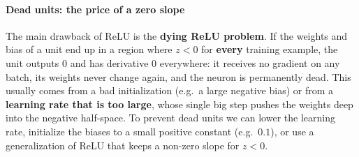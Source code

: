 \paragraph{Dead units: the price of a zero slope}
The main drawback of ReLU is the \textbf{dying ReLU problem}. If the weights and
bias of a unit end up in a region where $z < 0$ for \textbf{every} training
example, the unit outputs $0$ and has derivative $0$ everywhere: it receives no
gradient on any batch, its weights never change again, and the neuron is
permanently dead. This usually comes from a bad initialization (e.g.\ a large
negative bias) or from a \textbf{learning rate that is too large}, whose single
big step pushes the weights deep into the negative half-space. To prevent dead
units we can lower the learning rate, initialize the biases to a small positive
constant (e.g.\ $0.1$), or use a generalization of ReLU that keeps a non-zero slope
for $z < 0$.


